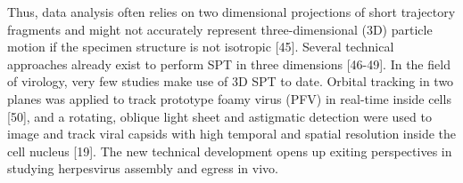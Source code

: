 Thus, data analysis often relies on two dimensional projections of short trajectory fragments and might not accurately represent three-dimensional (3D) particle motion if the specimen structure is not isotropic [45].
Several technical approaches already exist to perform SPT in three dimensions [46-49].
In the field of virology, very few studies make use of 3D SPT to date.
Orbital tracking in two planes was applied to track prototype foamy virus (PFV) in real-time inside cells [50], and a rotating, oblique light sheet and astigmatic detection were used to image and track viral capsids with high temporal and spatial resolution inside the cell nucleus [19].
The new technical development opens up exiting perspectives in studying herpesvirus assembly and egress in vivo.


%
